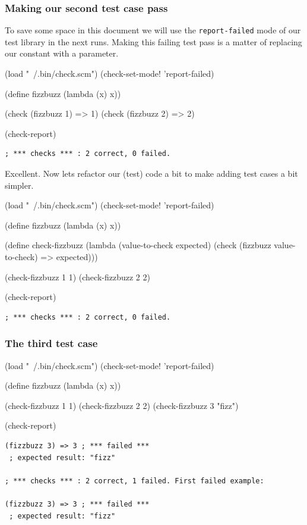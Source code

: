 \documentclass[12pt,a4paper,english,twoside]{article}
\begin{document}
\subsubsection{Making our second test case pass}
To save some space in this document we will use the \texttt{report-failed} 
mode of our test library in the next runs. Making this failing test pass is a 
matter of replacing our constant with a parameter.
\begin{schemecode}
(load "~/.bin/check.scm")
(check-set-mode! 'report-failed)

(define fizzbuzz (lambda (x) x))

(check (fizzbuzz 1) => 1)
(check (fizzbuzz 2) => 2)

(check-report)
\end{schemecode}
\begin{lstlisting}
; *** checks *** : 2 correct, 0 failed.  
\end{lstlisting}
Excellent. Now lets refactor our (test) code a bit to make adding test cases 
a bit simpler.
\begin{schemecode}
(load "~/.bin/check.scm")
(check-set-mode! 'report-failed)

(define fizzbuzz (lambda (x) x))

(define check-fizzbuzz 
  (lambda (value-to-check expected)
    (check (fizzbuzz value-to-check) => expected)))

(check-fizzbuzz 1 1)
(check-fizzbuzz 2 2)

(check-report)
\end{schemecode}
\begin{lstlisting}
; *** checks *** : 2 correct, 0 failed.  
\end{lstlisting}

\subsubsection{The third test case}
\begin{schemecode}
(load "~/.bin/check.scm")
(check-set-mode! 'report-failed)

(define fizzbuzz (lambda (x) x))

(check-fizzbuzz 1 1)
(check-fizzbuzz 2 2)
(check-fizzbuzz 3 "fizz")

(check-report)
\end{schemecode}
\begin{lstlisting}
(fizzbuzz 3) => 3 ; *** failed ***
 ; expected result: "fizz"

; *** checks *** : 2 correct, 1 failed. First failed example:

(fizzbuzz 3) => 3 ; *** failed ***
 ; expected result: "fizz"
\end{lstlisting}
\end{document}
